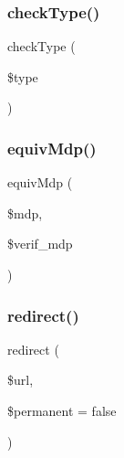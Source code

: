 \mbox{\label{functions_8php_a317e14368c8a0b6bc84fb0f3d8fa0094}} 
\subsubsection{check\+Type()}
{\footnotesize\ttfamily check\+Type (\begin{DoxyParamCaption}\item[{}]{\$type }\end{DoxyParamCaption})}

\mbox{\label{functions_8php_ad83ec1bb9f70b51b108be0c5235b5eb6}} 
\subsubsection{equiv\+Mdp()}
{\footnotesize\ttfamily equiv\+Mdp (\begin{DoxyParamCaption}\item[{}]{\$mdp,  }\item[{}]{\$verif\+\_\+mdp }\end{DoxyParamCaption})}

\mbox{\label{functions_8php_a5adc52f677f6532633cb8e552488860f}} 
\subsubsection{redirect()}
{\footnotesize\ttfamily redirect (\begin{DoxyParamCaption}\item[{}]{\$url,  }\item[{}]{\$permanent = {\ttfamily false} }\end{DoxyParamCaption})}

